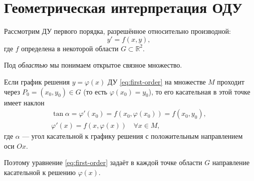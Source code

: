 \documentclass[12pt,a4paper]{article}
\numberwithin{equation}{section}
\begin{document}
\section[Геометрическая интерпретация ОДУ]{Геометрическая интерпретация ОДУ}

Рассмотрим ДУ первого порядка, разрешённое относительно производной:
\begin{equation}
 y'=f(x,y),
 \label{eq:first-order}
\end{equation}
где $f$ определена в некоторой области $G\subset\mathbb{R}^2$.

\begin{remarkHSE}
Под \textit{областью} мы понимаем открытое связное множество.
\end{remarkHSE}

Если график решения $y=\varphi(x)$ ДУ \eqref{eq:first-order} на множестве \(M\) проходит через $P_0=(x_0,y_0)\in G$ (то есть \(\varphi(x_0)=y_0\)), то его касательная в этой точке имеет наклон
\begin{gather*}
\tan\alpha=\varphi'(x_0)=f(x_0,\varphi(x_0))=f(x_0,y_0),\\
\varphi'(x)=f(x,\varphi(x))\quad\forall x\in M,
\end{gather*}
где $\alpha$ --- угол касательной к графику решения с положительным направлением оси $Ox$.

Поэтому уравнение \eqref{eq:first-order} задаёт в каждой точке области \(G\) направление касательной к решению \(\varphi(x)\).
\end{document}
